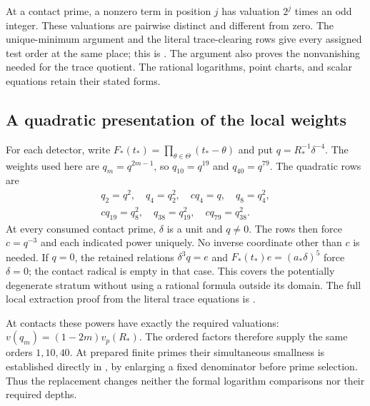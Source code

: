 \documentclass[11pt,a4paper]{article}
\theoremstyle{remark}\newtheorem{remark}[theorem]{Remark}
\begin{document}
At a contact prime, a nonzero term in position $j$ has valuation
$2^j$ times an odd integer. These valuations are pairwise distinct
and different from zero. The unique-minimum argument and the literal
trace-clearing rows give every assigned test order at the same place;
this is \cite[Proposition~2.3]{Shared}. The argument also proves the
nonvanishing needed for the trace quotient. The rational logarithms,
point charts, and scalar equations retain their stated forms.


\subsection{A quadratic presentation of the local weights}
For each detector, write $F_*(t_*)=\prod_{\theta\in\Theta}(t_*-\theta)$
and put $q=R_*^{-1}\delta^{-4}$. The weights used here
are $q_m=q^{2m-1}$, so $q_{10}=q^{19}$ and $q_{40}=q^{79}$.
The quadratic rows are
\[
 \begin{gathered}
 q_2=q^2,\quad q_4=q_2^2,\quad c q_4=q,\quad q_8=q_4^2,\\
 c q_{19}=q_8^2,\quad q_{38}=q_{19}^2,\quad c q_{79}=q_{38}^2.
 \end{gathered}
\]
At every consumed contact prime, $\delta$ is a unit and $q\ne0$.
The rows then force $c=q^{-3}$ and each indicated power uniquely.
No inverse coordinate other than $c$ is needed. If $q=0$, the retained
relations $\delta^3q=e$ and $F_*(t_*)e=(a_*\delta)^5$ force
$\delta=0$; the contact radical is empty in that case.
This covers the potentially degenerate stratum without using a rational
formula outside its domain. The full local extraction proof from the
literal trace equations is \cite[Section 2]{Shared}.

At contacts these powers have exactly the required valuations:
$v(q_m)=(1-2m)v_p(R_*)$. The ordered factors therefore supply the same
orders $1,10,40$. At prepared finite primes their simultaneous smallness
is established directly in \cite[Section 3]{Shared}, by enlarging a fixed
denominator before prime selection. Thus the replacement changes neither
the formal logarithm comparisons nor their required depths.
\end{document}
